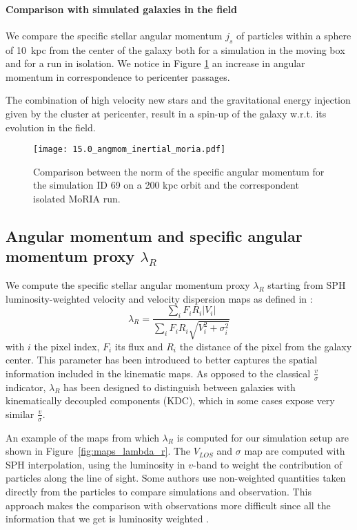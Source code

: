 \paragraph{Comparison with simulated galaxies in the field}
We compare the specific stellar angular momentum $j_s$ of particles within a sphere of 10~kpc from the center of the galaxy both for a simulation in the moving box and for a run in isolation.
We notice in Figure \ref{fig:j_s_moria} an increase in angular momentum in correspondence to pericenter passages.

The combination of high velocity new stars and the gravitational energy injection given by the cluster at pericenter, result in a spin-up of the galaxy w.r.t. its evolution in the field.

\begin{figure}
\centering
\texttt{[image: 15.0\_angmom\_inertial\_moria.pdf]}
\caption{Comparison between the norm of the specific angular momentum for the simulation ID 69 on a 200 kpc orbit and the correspondent isolated MoRIA run.}
\label{fig:j_s_moria}
\end{figure}

\subsection{Angular momentum and specific angular momentum proxy $\lambda_R$}
We compute the specific stellar angular momentum proxy $\lambda_R$ starting from SPH luminosity-weighted velocity and velocity dispersion maps as defined in \citet{Emsellem2007}: %
\begin{equation}
 \lambda_R = \dfrac{\sum_i F_i R_i |V_i|}{\sum_i F_i R_i \sqrt{V_i^2 + \sigma_i^2}}
\end{equation}
with $i$ the pixel index, $F_i$ its flux and $R_i$ the distance of the pixel from the galaxy center.
This parameter has been introduced to better captures the spatial information included in the kinematic maps.
As opposed to the classical $\frac{v}{\sigma}$ indicator, $\lambda_R$ has been designed to distinguish between galaxies with kinematically decoupled components (KDC), which in some cases expose very similar $\frac{v}{\sigma}$.

An example of the maps from which $\lambda_R$ is computed for our simulation setup are shown in Figure~\ref{fig:maps_lambda_r}.
The $V_{LOS}$ and $\sigma$ map are computed with SPH interpolation, using the luminosity in $v$-band to weight the contribution of particles along the line of sight.
Some authors \citep[e.g.][]{Schulze2018,Pillepich2019} use non-weighted quantities taken directly from the particles to compare simulations and observation.%
This approach makes the comparison with observations more difficult since all the information that we get is luminosity weighted \citep{Walo-Martin2020}.

